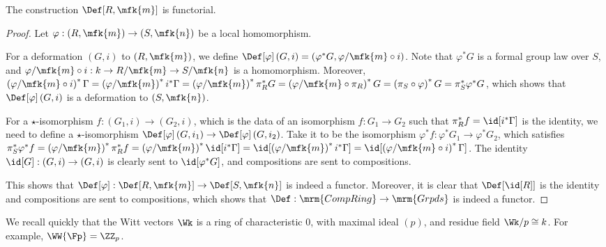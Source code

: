 \begin{proposition}[/definition]
	The construction $\Def[R, \mfk{m}]$ is functorial.
\end{proposition}

\begin{proof}
	Let $\varphi: \left(R, \mfk{m}\right) \to \left(S, \mfk{n}\right)$ be a local homomorphism.
	
	For a deformation $\left(G, i\right)$ to $\left(R, \mfk{m}\right)$, we define
	$
	\Def[\varphi]\left(G, i\right)
	= \left(\varphi^* G, \varphi/\mfk{m} \circ i\right)
	$.
	Note that $\varphi^* G$ is a formal group law over $S$, and $\varphi/\mfk{m} \circ i: k \to R/\mfk{m} \to S/\mfk{n}$ is a homomorphism.
	Moreover,
	$
	\left(\varphi/\mfk{m} \circ i\right)^* \Gamma
	= \left(\varphi/\mfk{m}\right)^* i^* \Gamma
	= \left(\varphi/\mfk{m}\right)^* \pi_R^* G
	= \left(\varphi/\mfk{m} \circ \pi_R\right)^* G
	= \left(\pi_S \circ \varphi\right)^* G
	= \pi_S^* \varphi^* G
	$,
	which shows that $\Def[\varphi]\left(G, i\right)$ is a deformation to $\left(S, \mfk{n}\right)$.
	
	For a $\star$-isomorphism $f: \left(G_1, i\right) \to \left(G_2, i\right)$, which is the data of an isomorphism $f: G_1 \to G_2$ such that $\pi_R^* f = \id[i^*\Gamma]$ is the identity, we need to define a $\star$-isomorphism $\Def[\varphi]\left(G, i_1\right) \to \Def[\varphi]\left(G, i_2\right)$.
	Take it to be the isomorphism $\varphi^* f: \varphi^* G_1 \to \varphi^* G_2$, which satisfies
	$
	\pi_S^* \varphi^* f
	= \left(\varphi/\mfk{m}\right)^* \pi_R^* f
	= \left(\varphi/\mfk{m}\right)^* \id[i^*\Gamma]
	= \id[\left(\varphi/\mfk{m}\right)^* i^*\Gamma]
	= \id[\left(\varphi/\mfk{m} \circ i \right)^*\Gamma]
	$.
	The identity $\id[G]: \left(G, i\right) \to \left(G, i\right)$ is clearly sent to $\id[\varphi^* G]$, and compositions are sent to compositions.
	
	This shows that $\Def[\varphi]: \Def[R, \mfk{m}] \to \Def[S, \mfk{n}]$ is indeed a functor.
	Moreover, it is clear that $\Def[{\id[R]}]$ is the identity and compositions are sent to compositions, which shows that $\Def: \mrm{CompRing} \to \mrm{Grpds}$ is indeed a functor.
\end{proof}

\begin{remark}
	We recall quickly that the Witt vectors $\Wk$ is a ring of characteristic $0$, with maximal ideal $\left(p\right)$, and residue field $\Wk/p \cong k$.
	For example, $\WW{\Fp} = \ZZ_p$.
\end{remark}

